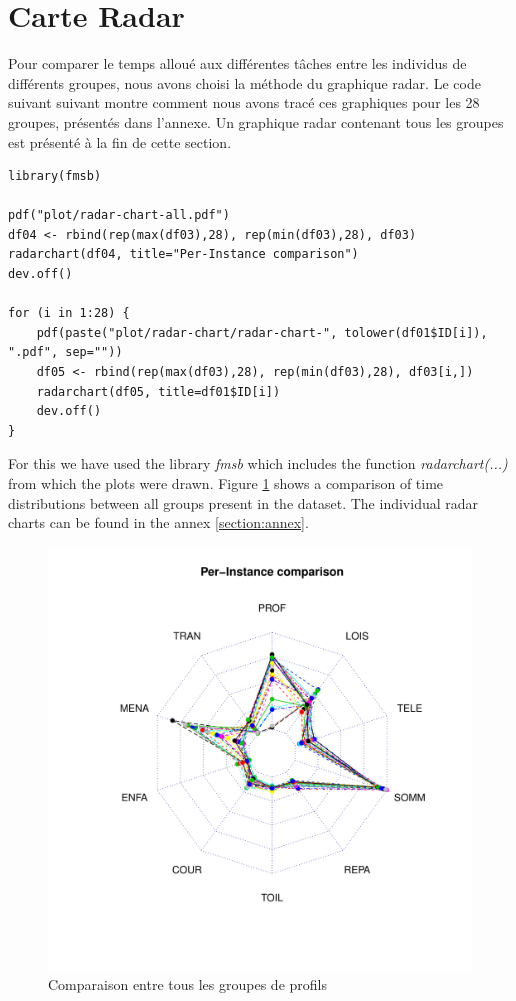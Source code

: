 \documentclass[11pt]{article}
\begin{document}
\section{Carte Radar}
Pour comparer le temps alloué aux différentes tâches entre les individus de
différents groupes, nous avons choisi la méthode du graphique radar. Le code
suivant suivant montre comment nous avons tracé ces graphiques pour les 28
groupes, présentés dans l'annexe. Un graphique radar contenant tous les groupes
est présenté à la fin de cette section.
\begin{verbatim}
library(fmsb)

pdf("plot/radar-chart-all.pdf")
df04 <- rbind(rep(max(df03),28), rep(min(df03),28), df03)
radarchart(df04, title="Per-Instance comparison")
dev.off()

for (i in 1:28) {
    pdf(paste("plot/radar-chart/radar-chart-", tolower(df01$ID[i]), ".pdf", sep=""))
    df05 <- rbind(rep(max(df03),28), rep(min(df03),28), df03[i,])
    radarchart(df05, title=df01$ID[i])
    dev.off()
}
\end{verbatim}
For this we have used the library \textit{fmsb} which includes the function
\textit{radarchart(...)} from which the plots were drawn. Figure
\ref{fig:radar-chart-all} shows a comparison of time distributions between all
groups present in the dataset. The individual radar charts can be found in the
annex \ref{section:annex}.
\begin{figure}[h]
  \centering
  \includegraphics[scale=0.4]{../plot/radar-chart-all.pdf}
  \caption{Comparaison entre tous les groupes de profils}
  \label{fig:radar-chart-all}
\end{figure}
\end{document}
